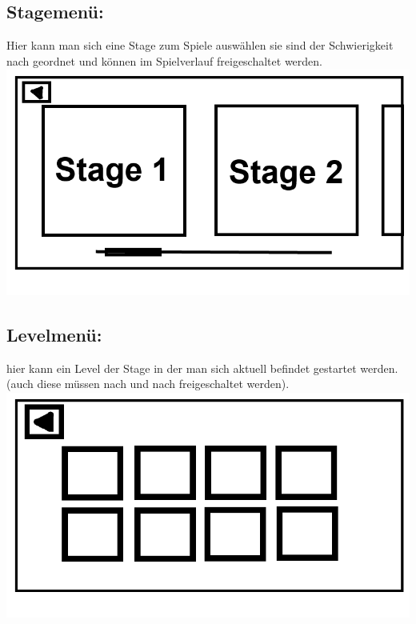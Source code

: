 \documentclass{scrartcl}
\begin{document}
\begin{enumerate}
	\begin{minipage}{1\textwidth}
		\item \subsection*{Stagemenü:}
		Hier kann man sich eine Stage zum Spiele auswählen sie sind der Schwierigkeit nach geordnet und können im Spielverlauf freigeschaltet werden.\\
		\includegraphics[width=\textwidth, height=7.5cm]{assets/Stagemenu}
	\end{minipage}
	
	\begin{minipage}{1\textwidth}
		\item \subsection*{Levelmenü:}
		hier kann ein Level der Stage in der man sich aktuell befindet gestartet werden.(auch diese müssen nach und nach freigeschaltet werden).\\
		\includegraphics[width=\textwidth, height=7.5cm]{assets/Levelmenu}
	\end{minipage}
	

\end{enumerate}
\end{document}
